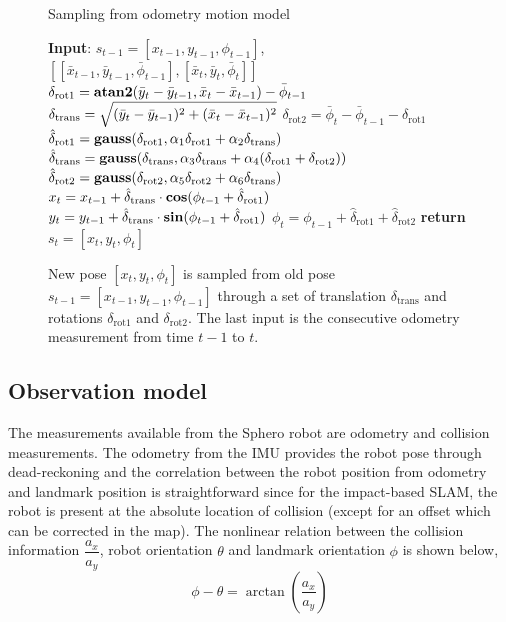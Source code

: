 \begin{figure}
\begin{algorithm}[H]
\caption{Sampling from odometry motion model}\label{alg_odom}
\begin{algorithmic}[1]
\BState \textbf{Input}: $s_{t-1}=[x_{t-1},y_{t-1},\phi_{t-1}]$, $[[\bar{x}_{t-1},\bar{y}_{t-1},\bar{\phi}_{t-1}],[\bar{x}_{t},\bar{y}_{t},\bar{\phi}_{t}]]$
\State $\delta_{\text{rot1}} = {\bf atan2}(\bar{y}_{t}-\bar{y}_{t-1},\bar{x}_{t}-\bar{x}_{t-1}) - \bar{\phi}_{t-1}$
\State $\delta_{\text{trans}} = \sqrt{\strut(\bar{y}_{t}-\bar{y}_{t-1})^2+(\bar{x}_{t}-\bar{x}_{t-1})^2}$
\State $\delta_{\text{rot2}} = \bar{\phi}_{t} - \bar{\phi}_{t-1} - \delta_{\text{rot1}}$
\EndProcedure
{}
\State $\hat{\delta}_{\text{rot1}} = {\bf gauss}(\delta_{\text{rot1}},\alpha_1\delta_{\text{rot1}}+\alpha_2\delta_{\text{trans}})$
\State $\hat{\delta}_{\text{trans}} = {\bf gauss}(\delta_{\text{trans}},\alpha_3\delta_{\text{trans}}+\alpha_4(\delta_{\text{rot1}}+\delta_{\text{rot2}}))$
\State $\hat{\delta}_{\text{rot2}} = {\bf gauss}(\delta_{\text{rot2}},\alpha_5\delta_{\text{rot2}}+\alpha_6\delta_{\text{trans}})$
\EndProcedure
{}
\State $x_t = x_{t-1} + \hat{\delta}_{\text{trans}}\cdot{\bf cos}(\phi_{t-1}+\hat{\delta}_{\text{rot1}})$
\State $y_t = y_{t-1} + \hat{\delta}_{\text{trans}}\cdot{\bf sin}(\phi_{t-1}+\hat{\delta}_{\text{rot1}})$
\State $\phi_t = \phi_{t-1}+\hat{\delta}_{\text{rot1}}+\hat{\delta}_{\text{rot2}}$
\State \textbf{return} $s_t=[x_t,y_t,\phi_t]$
\EndProcedure
\end{algorithmic}
\end{algorithm} 
\caption[Sampling algorithm for odometry motion model]{New pose $[x_t,y_t,\phi_t]$ is sampled from old pose $s_{t-1}=[x_{t-1},y_{t-1},\phi_{t-1}]$ through a set of translation $\delta_{\text{trans}}$ and rotations $\delta_{\text{rot1}}$ and $\delta_{\text{rot2}}$. The last input is the consecutive odometry measurement from time $t-1$ to $t$.}
\end{figure}

\subsection{Observation model}   
The measurements available from the Sphero robot are odometry and collision measurements. The odometry from the IMU provides the robot pose through dead-reckoning and the correlation between the robot position from odometry and landmark position is straightforward since for the impact-based SLAM, the robot is present at the absolute location of collision (except for an offset which can be corrected in the map). The nonlinear relation between the collision information $\dfrac{a_x}{a_y}$, robot orientation $\theta$ and landmark orientation $\phi$ is shown below,
\begin{equation*}
\phi-\theta = \arctan\left(\frac{a_x}{a_y}\right)
\end{equation*}

